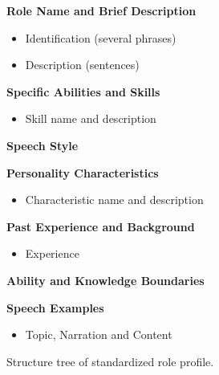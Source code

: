 \begin{figure}[!htbp]
\begin{tcolorbox}[
    colback=gray!10,      %
    colframe=gray!80,     %
    title=Template of Standardized Role Profile,
    fonttitle=\bfseries,  %
    rounded corners,
    boxrule=0.5mm,        %
    width=\linewidth
]
\small

\textbf{Role Name and Brief Description}
\begin{itemize}[noitemsep,topsep=0pt]
    \item Identification (several phrases)
    \item Description (sentences)
\end{itemize}

\textbf{Specific Abilities and Skills}
\begin{itemize}[noitemsep,topsep=0pt]
    \item Skill name and description
\end{itemize}

\textbf{Speech Style}

\textbf{Personality Characteristics}
\begin{itemize}[noitemsep,topsep=0pt]
    \item Characteristic name and description
\end{itemize}

\textbf{Past Experience and Background}
\begin{itemize}[noitemsep,topsep=0pt]
    \item Experience
\end{itemize}

\textbf{Ability and Knowledge Boundaries}

\textbf{Speech Examples}
\begin{itemize}[noitemsep,topsep=0pt]
    \item Topic, Narration and Content
\end{itemize}

\end{tcolorbox}
\vspace{-2mm}
\caption{Structure tree of standardized role profile.}
\label{fig:tree}
\end{figure}

